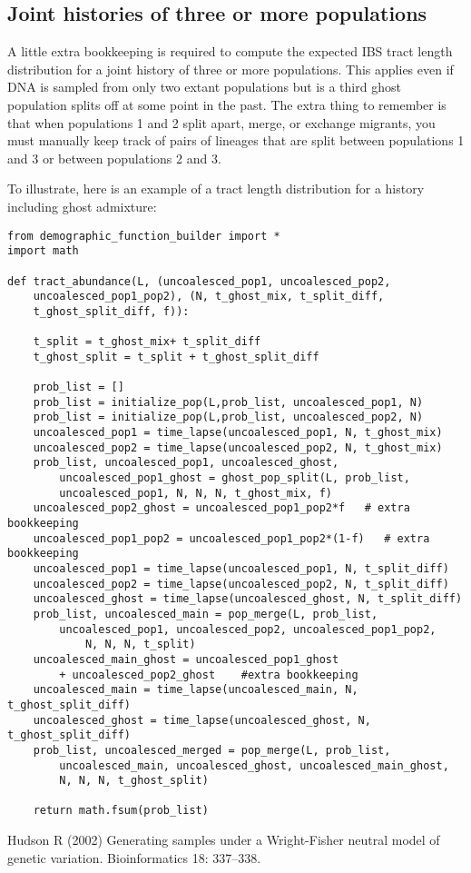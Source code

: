 \documentclass[12pt]{article}
\begin{document}
\subsection{Joint histories of three or more populations}
A little extra bookkeeping is required to compute the expected IBS tract length distribution for a joint history of three or more populations. This applies even if DNA is sampled from only two extant populations but is a third ghost population splits off at some point in the past. The extra thing to remember is that when populations 1 and 2 split apart, merge, or exchange migrants, you must manually keep track of pairs of lineages that are split between populations 1 and 3  or between populations 2 and 3. 


To illustrate, here is an example of a tract length distribution for a history including ghost admixture:

\begin{Verbatim}
from demographic_function_builder import *
import math

def tract_abundance(L, (uncoalesced_pop1, uncoalesced_pop2,
	uncoalesced_pop1_pop2), (N, t_ghost_mix, t_split_diff, 
	t_ghost_split_diff, f)):
	
	t_split = t_ghost_mix+ t_split_diff
	t_ghost_split = t_split + t_ghost_split_diff
	
	prob_list = []
	prob_list = initialize_pop(L,prob_list, uncoalesced_pop1, N)
	prob_list = initialize_pop(L,prob_list, uncoalesced_pop2, N)
	uncoalesced_pop1 = time_lapse(uncoalesced_pop1, N, t_ghost_mix)
	uncoalesced_pop2 = time_lapse(uncoalesced_pop2, N, t_ghost_mix)
	prob_list, uncoalesced_pop1, uncoalesced_ghost, 
		uncoalesced_pop1_ghost = ghost_pop_split(L, prob_list, 
		uncoalesced_pop1, N, N, N, t_ghost_mix, f)
	uncoalesced_pop2_ghost = uncoalesced_pop1_pop2*f   # extra bookkeeping
	uncoalesced_pop1_pop2 = uncoalesced_pop1_pop2*(1-f)   # extra bookkeeping
	uncoalesced_pop1 = time_lapse(uncoalesced_pop1, N, t_split_diff)
	uncoalesced_pop2 = time_lapse(uncoalesced_pop2, N, t_split_diff)
	uncoalesced_ghost = time_lapse(uncoalesced_ghost, N, t_split_diff)
	prob_list, uncoalesced_main = pop_merge(L, prob_list, 
		uncoalesced_pop1, uncoalesced_pop2, uncoalesced_pop1_pop2, 
			N, N, N, t_split)
	uncoalesced_main_ghost = uncoalesced_pop1_ghost 
		+ uncoalesced_pop2_ghost	#extra bookkeeping
	uncoalesced_main = time_lapse(uncoalesced_main, N, t_ghost_split_diff)
	uncoalesced_ghost = time_lapse(uncoalesced_ghost, N, t_ghost_split_diff)
	prob_list, uncoalesced_merged = pop_merge(L, prob_list, 
		uncoalesced_main, uncoalesced_ghost, uncoalesced_main_ghost, 
		N, N, N, t_ghost_split)
	
	return math.fsum(prob_list)
\end{Verbatim}

\begin{thebibliography}{99}

  Hudson R (2002) Generating samples under a Wright-Fisher neutral model of genetic variation. Bioinformatics 18: 337--338.
\end{thebibliography}
\end{document}
